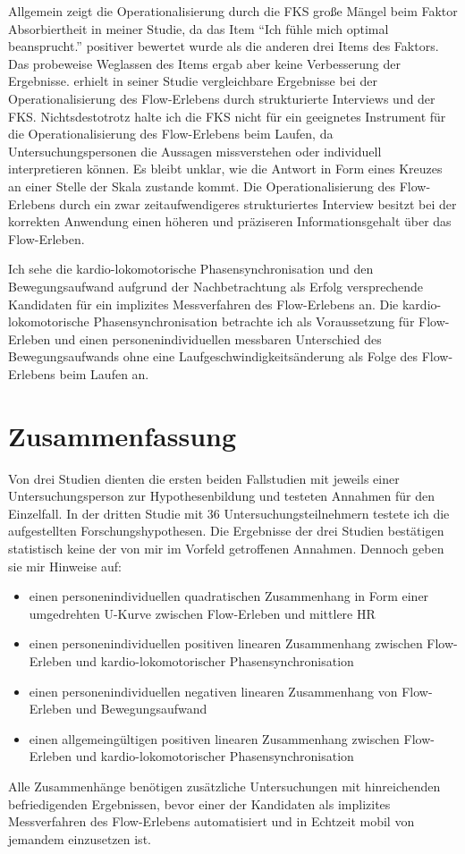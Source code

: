 Allgemein zeigt die Operationalisierung durch die \ac{FKS} große Mängel beim Faktor Absorbiertheit in meiner Studie, da das Item "`Ich fühle mich optimal beansprucht."' positiver bewertet wurde als die anderen drei Items des Faktors. Das probeweise Weglassen des Items ergab aber keine Verbesserung der Ergebnisse. \citet{Henk2014} erhielt in seiner Studie vergleichbare Ergebnisse bei der Operationalisierung des Flow-Erlebens durch strukturierte Interviews und der \ac{FKS}. Nichtsdestotrotz halte ich die \ac{FKS} nicht für ein geeignetes Instrument für die Operationalisierung des Flow-Erlebens beim Laufen, da Untersuchungspersonen die Aussagen missverstehen oder individuell interpretieren können. Es bleibt unklar, wie die Antwort in Form eines Kreuzes an einer Stelle der Skala zustande kommt. Die Operationalisierung des Flow-Erlebens durch ein zwar zeitaufwendigeres strukturiertes Interview besitzt bei der korrekten Anwendung einen höheren und präziseren Informationsgehalt über das Flow-Erleben. 

Ich sehe die kardio-lokomotorische Phasensynchronisation und den Bewegungsaufwand aufgrund der Nachbetrachtung als Erfolg versprechende Kandidaten für ein implizites Messverfahren des Flow-Erlebens an. Die kardio-lokomotorische Phasensynchronisation betrachte ich als Voraussetzung für Flow-Erleben und einen personenindividuellen messbaren Unterschied des Bewegungsaufwands ohne eine Laufgeschwindigkeitsänderung als Folge des Flow-Erlebens beim Laufen an. 

\section{Zusammenfassung}
\label{sec:zusammenfassung_5}

Von drei Studien dienten die ersten beiden Fallstudien mit jeweils einer Untersuchungsperson zur Hypothesenbildung und testeten Annahmen für den Einzelfall. In der dritten Studie mit 36 Untersuchungsteilnehmern testete ich die aufgestellten Forschungshypothesen. Die Ergebnisse der drei Studien bestätigen statistisch keine der von mir im Vorfeld getroffenen Annahmen. Dennoch geben sie mir Hinweise auf:

\begin{itemize}
	\item einen personenindividuellen quadratischen Zusammenhang in Form einer umgedrehten U-Kurve zwischen Flow-Erleben und mittlere HR
	\item einen personenindividuellen positiven linearen Zusammenhang zwischen Flow-Erleben und kardio-lokomotorischer Phasensynchronisation
	\item einen personenindividuellen negativen linearen Zusammenhang von Flow-Erleben und Bewegungsaufwand
	\item einen allgemeingültigen positiven linearen Zusammenhang zwischen Flow-Erleben und kardio-lokomotorischer Phasensynchronisation
\end{itemize}

Alle Zusammenhänge benötigen zusätzliche Untersuchungen mit hinreichenden befriedigenden Ergebnissen, bevor einer der Kandidaten als implizites Messverfahren des Flow-Erlebens automatisiert und in Echtzeit mobil von jemandem einzusetzen ist. 